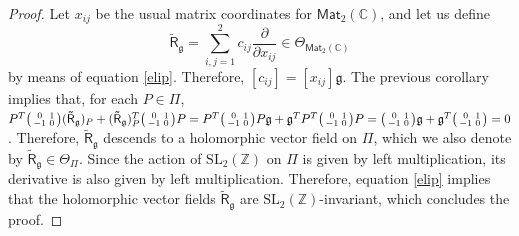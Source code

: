 \documentclass{article}
\numberwithin{equation}{section}
\numberwithin{figure}{section}
\theoremstyle{plain}
\theoremstyle{definition}
\numberwithin{equation}{section}
\newtheorem[S, bodystyle=\normalfont\noindent]{defiS}{Definition}[section]
\begin{document}
\begin{proof}
Let $x_{ij}$ be the usual matrix coordinates for $\mathsf{Mat}_2(\mathbb{C})$, and let us define 
\begin{equation}
\tilde{\mathsf{R}}_{\mathfrak{g}}=\sum_{i,j=1}^2 c_{ij}\frac{\partial}{\partial x_{ij}}\in \Theta_{\mathsf{Mat}_2(\mathbb{C})}
\end{equation}
by means of equation \ref{elip}. Therefore, $[c_{ij}]=[x_{ij}]\mathfrak{g}.$ The previous corollary implies that, for each $P\in \mathsf{\Pi}$, $P^T\begin{psmallmatrix} 0 & 1 \\ -1& 0\end{psmallmatrix}(\mathsf{\tilde{R}}_{\mathfrak{g}})_P+(\mathsf{\tilde{R}}_{\mathfrak{g}})_P^T\begin{psmallmatrix} 0 & 1 \\ -1& 0\end{psmallmatrix} P=P^T\begin{psmallmatrix} 0 & 1 \\ -1& 0\end{psmallmatrix} P \mathfrak{g}+\mathfrak{g}^T P^T\begin{psmallmatrix} 0 & 1 \\ -1& 0\end{psmallmatrix} P=\begin{psmallmatrix} 0 & 1 \\ -1& 0\end{psmallmatrix} \mathfrak{g}+\mathfrak{g}^T\begin{psmallmatrix} 0 & 1 \\ -1& 0\end{psmallmatrix}=0$. Therefore, $\tilde{\mathsf{R}}_{\mathfrak{g}}$ descends to a holomorphic vector field on $\mathsf{\Pi}$, which we also denote by $\tilde{\mathsf{R}}_{\mathfrak{g}}\in\Theta_{\mathsf{\Pi}}$. Since the action of $\text{SL}_2(\mathbb{Z})$ on $\mathsf{\Pi}$ is given by left multiplication, its derivative is also given by left multiplication. Therefore, equation \ref{elip} implies that the holomorphic vector fields  $\tilde{\mathsf{R}}_{\mathfrak{g}}$ are $\text{SL}_2(\mathbb{Z})$-invariant, which concludes the proof.

\end{proof}
\end{document}
